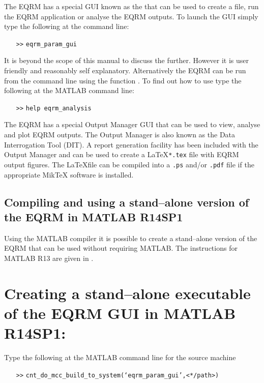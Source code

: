 The EQRM has a special GUI known as the
 that can be used to create a
 file, run the EQRM application or analyse
the EQRM outputs. To launch the GUI simply type the following at
the command line:
\begin{itemize} \item[\texttt{>>}] \texttt{eqrm\_param\_gui} \end{itemize}
It is beyond the scope of this manual to discuss the
 further. However it is user
friendly and reasonably self explanatory. Alternatively the EQRM
can be run from the command line using the function
. To find out how to use
 type the following at the MATLAB
command line: \begin{itemize} \item[\texttt{>>}] \texttt{help
eqrm\_analysis}
\end{itemize}

The EQRM has a special Output Manager GUI that can be used to
view, analyse and plot EQRM outputs. The Output Manager is also
known as the Data Interrogation Tool
(DIT). A report generation
facility has been included with the Output Manager and can be used
to create a \LaTeX \texttt{*.tex} file with EQRM output figures.
The \LaTeX file can be compiled into a \texttt{.ps} and/or
\texttt{.pdf} file if the appropriate MikTeX software is
installed.


\subsection{Compiling and using a stand--alone version of the EQRM in MATLAB R14SP1}

Using the MATLAB compiler it is possible to create a stand--alone
version of the EQRM that can be used without requiring MATLAB. The
instructions for MATLAB R13 are given in .

\section{Creating a stand--alone executable of the EQRM GUI in MATLAB R14SP1:}
\label{app:MATLABR13}

Type the following at the MATLAB command line for the source
machine \begin{itemize} \item[\texttt{>>}]
\texttt{cnt\_do\_mcc\_build\_to\_system(`eqrm\_param\_gui',<*/path>)}
\end{itemize}

